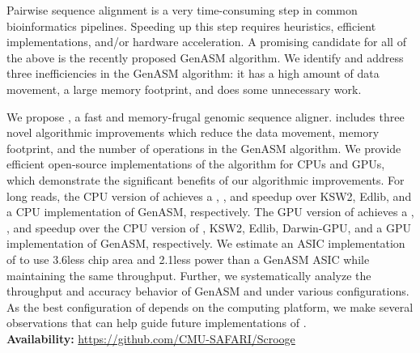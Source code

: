 Pairwise sequence alignment is a  very time-consuming step in common bioinformatics pipelines. Speeding up this step requires heuristics, efficient implementations, and/or hardware acceleration. A promising candidate for all of the above is the recently proposed GenASM algorithm. We identify and address three inefficiencies in the GenASM algorithm: it has a high amount of data movement, a large memory footprint, and does some unnecessary work.

We propose \toolname, a fast and memory-frugal genomic sequence aligner. \toolname includes three novel algorithmic improvements which reduce the  data movement, memory footprint, and the number of operations in the GenASM algorithm. We provide efficient open-source implementations of the \toolname algorithm for CPUs and GPUs, which demonstrate the significant benefits of our algorithmic improvements.
For long reads, the CPU version of \toolname achieves a \kswcpuspeedup, \edlibcpuspeedup, and \cpuoptspeedup speedup over KSW2, Edlib, and a CPU implementation of GenASM, respectively. The GPU version of \toolname achieves a \cpugpuspeedup \kswgpuspeedup, \edlibgpuspeedup, \darwingpuspeedup and \gpuoptspeedup speedup over the CPU version of \toolname, KSW2, Edlib, Darwin-GPU, and a GPU implementation of GenASM, respectively. We estimate an ASIC implementation of \toolname to use 3.6\x less chip area and 2.1\x less power than a GenASM ASIC while maintaining the same throughput. Further, we systematically analyze the throughput and accuracy behavior of GenASM and \toolname under various configurations. As the best configuration of \toolname depends on the computing platform, we make several observations that can help guide future implementations of \toolname.\\
\textbf{Availability:} \url{https://github.com/CMU-SAFARI/Scrooge}
